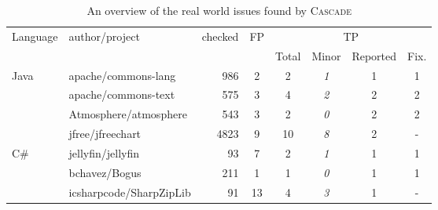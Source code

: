 \documentclass[acmsmall, screen]{acmart}
\newcommand{\tool}{\textsc{Cascade}\xspace}
\begin{document}
\begin{table}[tb]
\centering 
\caption{An overview of the real world issues found by \tool}\label{tab:realworld}
\begin{tabular}{@{}llrccccc@{}}
\toprule
\multirow{2}{*}{Language} & \multirow{2}{*}{author/project} & \multirow{2}{*}{checked} & \multicolumn{1}{c}{\multirow{2}{*}{FP}} & \multicolumn{4}{c}{TP}                                                                                                 \\ \cmidrule(l){5-8} 
                          &                                 &                          & \multicolumn{1}{c}{}                    & \multicolumn{1}{c}{Total} & \multicolumn{1}{c}{Minor} & \multicolumn{1}{c}{Reported}  & \multicolumn{1}{l}{Fix.} \\ \midrule
\multirow{4}{*}{Java}     & apache/commons-lang             & 986                      & 2                                       & 2                         & \textit{1}                & 1                                & 1                        \\
                          & apache/commons-text             & 575                      & 3                                       & 4                         & \textit{2}                & 2                                & 2                        \\
                          & Atmosphere/atmosphere           & 543                      & 3                                       & 2                         & \textit{0}                & 2                                & 2                        \\
                          & jfree/jfreechart                & 4823                     & 9                                       & 10                        & \textit{8}                & 2                                & -                        \\
\multirow{3}{*}{C\#}      & jellyfin/jellyfin               & 93                       & 7                                       & 2                         & \textit{1}                & 1                                & 1                        \\
                          & bchavez/Bogus                   & 211                      & 1                                       & 1                         & \textit{0}                & 1                                & 1                        \\
                          & icsharpcode/SharpZipLib         & 91                       & 13                                      & 4                         & \textit{3}                & 1                                & -                        \\

\end{tabular}
\end{table}
\end{document}
